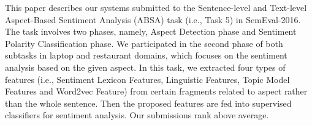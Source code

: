 This paper describes our systems submitted to the Sentence-level and Text-level Aspect-Based Sentiment Analysis (ABSA) task (i.e., Task 5) in SemEval-2016. The task involves two phases, namely, Aspect Detection phase and Sentiment Polarity Classification phase. We participated in the second phase of both subtasks in laptop and restaurant domains, which focuses on the sentiment analysis based on the given aspect. In this task, we extracted four types of features (i.e., Sentiment Lexicon Features, Linguistic Features, Topic Model Features and Word2vec Feature) from certain fragments related to  aspect rather than the whole sentence. Then the proposed features are fed into supervised classifiers for sentiment analysis. Our submissions rank above average.
